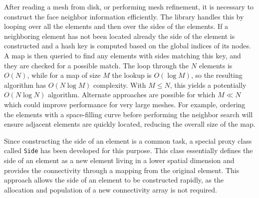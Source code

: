 \documentclass[global,twocolumn,final]{svjour}
\begin{document}
After reading a mesh from disk, or performing mesh refinement, it is
necessary to construct the face neighbor information efficiently.  The
library handles this by looping over all the elements and then over
the sides of the elements.  If a neighboring element has not been
located already the side of the element is constructed and a hash key
is computed based on the global indices of its nodes.  A map is then
queried to find any elements with sides matching this key, and they
are checked for a possible match.  The loop through the $N$ elements
is $O(N)$, while for a map of size $M$ the lookup is $O(\log M)$, so
the resulting algorithm has $O(N\log M)$ complexity. With 
$M \le N$, this yields a potentially $O(N\log N)$
algorithm.  Alternate approaches are possible for which $M \ll N$
which could improve performance for very large meshes.  For example,
ordering the elements with a space-filling curve before performing the
neighbor search will ensure adjacent elements are quickly located,
reducing the overall size of the map.

Since constructing the side of an element is a common task, a special
proxy class called \texttt{Side} has been developed for this purpose.
This class essentially defines the side of an element as a new element
living in a lower spatial dimension and provides the connectivity
through a mapping from the original element.  This approach allows the
side of an element to be constructed rapidly, as the allocation and
population of a new connectivity array is not required.
\end{document}
